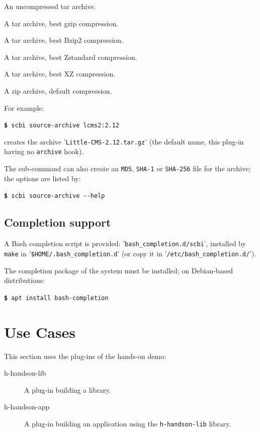 \documentclass[a4paper,12pt,twoside]{article}
\newcommand{\code}[1]{\texttt{#1}}
\newcommand{\file}[1]{'{\texttt{#1}}'}
\newcommand{\cmd}[1]{\tabto{1cm}\hspace{0.5cm}\texttt{\textbf{\$} #1}}
\let\stdsection\section
\renewcommand\section{\newpage\stdsection}
\newcommand{\ddash}{-{}-}
\begin{document}
\begin{description}[style=nextline]
	\item[.tar] An uncompressed tar archive.
	\item[.tar.gz] A tar archive, best gzip compression.
	\item[.tar.bz2] A tar archive, best Bzip2 compression.
	\item[.tar.zst] A tar archive, best Zstandard compression.
	\item[.tar.xz] A tar archive, best XZ compression.
	\item[.zip] A zip archive, default compression.
\end{description}

For example:

\cmd{scbi source-archive lcms2:2.12}

creates the archive \file{Little-CMS-2.12.tar.gz} (the default name, this plug-in having no \code{archive} hook).

The sub-command can also create an \code{MD5}, \code{SHA-1} or \code{SHA-256}
file for the archive; the options are listed by:

\cmd{scbi source-archive \ddash{}help}

\subsection{Completion support}
\label{completion}

A Bash completion script is provided: \file{bash\_completion.d/scbi}, installed by \code{make} in \file{\$HOME/.bash\_completion.d} (or copy it in \file{/etc/bash\_completion.d/}).

The completion package of the system must be installed; on Debian-based distributions:

\cmd{apt install bash-completion}


\section{Use Cases}

This section uses the plug-ins of the hands-on demo:

\begin{description}
	\item[h-handson-lib] A plug-in building a library.
	\item[h-handson-app] A plug-in building an application using the \code{h-handson-lib} library.
\end{description}
\end{document}
